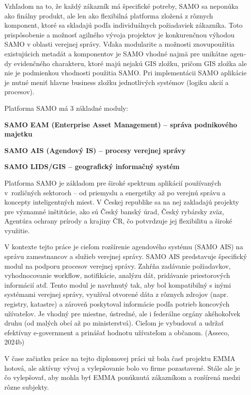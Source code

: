 Vzhľadom na to, že každý zákazník má špecifické potreby, SAMO sa neponúka ako finálny produkt, ale len ako flexibilná platforma zložená z rôznych komponent, ktoré sa skladajú podľa individuálnych požiadaviek zákazníka. Toto prispôsobenie a možnosť agilného vývoja projektov je konkurenčnou výhodou SAMO v oblasti verejnej správy. Vďaka modularite a možnosti znovupoužitia existujúcich metadát a komponentov je SAMO vhodné najmä pre unikátne agen-dy evidenčného charakteru, ktoré majú nejakú GIS zložku, pričom GIS zložka ale nie je podmienkou vhodnosti použitia SAMO. Pri implementácii SAMO aplikácie je nutné meniť hlavne business zložku jednotlivých systémov (logiku akcií a procesov).

Platforma SAMO má 3 základné moduly:

\startitemize
\item \start\bf SAMO EAM \stop (Enterprise Asset Management) --  správa podnikového majetku
\item \start\bf SAMO AIS \stop (Agendový IS) -- procesy verejnej správy
\item  \start\bf SAMO LIDS/GIS \stop -- geografický informačný systém
\stopitemize

Platforma SAMO je základom pre široké spektrum aplikácií používaných v~rozličných sektoroch – od priemyslu a energetiky až po verejnú správu a koncepty inteligentných miest. V Českej republike sa na nej zakladajú projekty pre významné inštitúcie, ako sú Český banský úrad, Český rybársky zväz, Agentúra ochrany prírody a krajiny ČR, čo potvrdzuje jej flexibilitu a široké využitie.


V kontexte tejto práce je cieľom rozšírenie agendového systému (SAMO AIS) na správu zamestnancov a služieb verejnej správy. SAMO AIS predstavuje špecifický modul na podporu procesov verejnej správy. Zahŕňa zadávanie požiadavkov, vyhodnocovanie workflow, notifikácie, analýzu dát, pridávanie priestorových informácií atď. Tento modul je navrhnutý tak, aby bol kompatibilný s inými systémami verejnej správy, využíval otvorené dáta z rôznych zdrojov (napr. registry, katastre) a zároveň poskytoval informácie podľa potrieb koncových užívateľov. Je vhodný pre miestne, ústredné, ale i federálne orgány akéhokoľvek druhu (od malých obcí až po ministerstvá). Cieľom je vybudovať a udržať efektívny e-government a prinášať hodnotu užívateľom a občanom. \scr(Asseco, 2024b)


V čase začiatku práce na tejto diplomovej práci už bola časť projektu EMMA hotová, ale aktívny vývoj a vylepšovanie bolo vo firme pozastavené. Stále ale je čo vylepšovať, aby mohla byť EMMA ponúknutá zákazníkom a rozšírená medzi rôzne subjekty.

